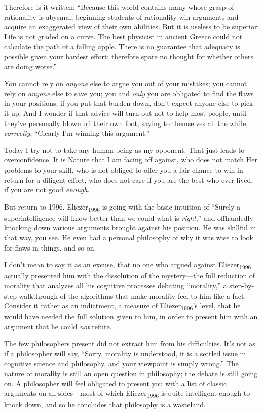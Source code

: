 {
 Therefore is it written: ``Because this world
contains many whose grasp of rationality is abysmal, beginning students
of rationality win arguments and acquire an exaggerated view of their
own abilities. But it is useless to be superior: Life is not graded on
a curve. The best physicist in ancient Greece could not calculate the
path of a falling apple. There is no guarantee that adequacy is
possible given your hardest effort; therefore spare no thought for
whether others are doing worse.''}

{
 You cannot rely on \textit{anyone} else to argue you out of your
mistakes; you cannot rely on \textit{anyone} else to save you; you and
\textit{only} you are obligated to find the flaws in your positions; if
you put that burden down, don't expect anyone else to
pick it up. And I wonder if that advice will turn out not to help most
people, until they've personally blown off their own
foot, saying to themselves all the while, \textit{correctly},
``Clearly I'm winning this
argument.''}

{
 Today I try not to take any human being as my opponent. That just
leads to overconfidence. It is Nature that I am facing off against, who
does not match Her problems to your skill, who is not obliged to offer
you a fair chance to win in return for a diligent effort, who does not
care if you are the best who ever lived, if you are not good
\textit{enough.}}

{
 But return to 1996. Eliezer\textsubscript{1996} is going with the
basic intuition of ``Surely a superintelligence will
know better than we could what is \textit{right},''
and offhandedly knocking down various arguments brought against his
position. He was skillful in that way, you see. He even had a personal
philosophy of why it was wise to look for flaws in things, and so on.}

{
 I don't mean to say it as an excuse, that no one
who argued against Eliezer\textsubscript{1996} actually presented him
with the dissolution of the mystery---the full reduction of morality
that analyzes all his cognitive processes debating
``morality,'' a step-by-step
walkthrough of the algorithms that make morality feel to him like a
fact. Consider it rather as an indictment, a measure of
Eliezer\textsubscript{1996}'s level, that he would have
needed the full solution given to him, in order to present him with an
argument that he could \textit{not} refute.}

{
 The few philosophers present did not extract him from his
difficulties. It's not as if a philosopher will say,
``Sorry, morality is understood, it is a settled issue
in cognitive science and philosophy, and your viewpoint is simply
wrong.'' The nature of morality is still an open
question in philosophy; the debate is still going on. A philosopher
will feel obligated to present you with a list of classic arguments on
all sides---most of which Eliezer\textsubscript{1996} is quite
intelligent enough to knock down, and so he concludes that philosophy
is a wasteland.}

